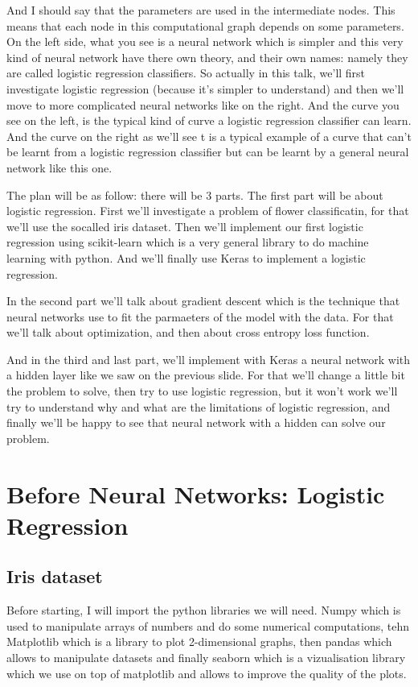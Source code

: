\documentclass{article}
\begin{document}
And I should say that the parameters are used in the intermediate nodes.
This means that each node in this computational graph depends 
on some parameters. 
On the left side, what you see is a neural network which is simpler and this very kind of neural network have there own theory, and their own names: namely they are called logistic regression classifiers.
So actually in this talk, we'll first investigate logistic regression (because it's 
simpler to understand) and then we'll move to more complicated neural networks like on the right.
And the curve you see on the left, is the typical kind of curve a logistic regression 
classifier can learn. 
And the curve on the right as we'll see t is a typical example of a curve that  can't be learnt from a logistic regression classifier but can be learnt by a general neural network like this one.

The plan will be as follow:
there will be 3 parts. 
The first part will be about logistic regression.
First we'll investigate a problem of flower classificatin, for that we'll use the socalled iris dataset.
Then we'll  implement our first logistic regression using scikit-learn which is 
a very general  library to do machine learning with python.
And we'll finally use Keras to implement a logistic regression.

In the second part we'll talk about gradient descent which is 
the technique that neural networks use to fit the parmaeters of the model with the data.
For that we'll talk about optimization, and then about cross entropy loss function.

And in the third and last part, we'll implement with Keras a neural network with 
a hidden layer like we saw on the previous slide.
For that we'll change a little bit the problem to solve, then 
try to use logistic regression, but it won't work we'll try to understand why and what are the limitations of logistic regression, 
and finally we'll be happy to see that neural network with a hidden can solve our problem.

\section{Before Neural Networks: Logistic Regression}

\subsection{Iris dataset}

Before starting, I will import the python libraries we will need.
Numpy which is used to manipulate arrays of numbers 
and do some numerical computations, tehn
Matplotlib which is a library to plot 2-dimensional graphs, then 
pandas which allows to manipulate  datasets
and finally seaborn which is a vizualisation library which we use on top of matplotlib and 
allows to improve the quality of the plots.
\end{document}
